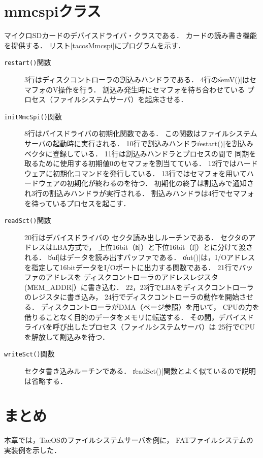 \section{mmcspiクラス}
\label{tacosLbaDriver}
マイクロSDカードのデバイスドライバ・クラスである．
カードの読み書き機能を提供する．
リスト\ref{tacosMmcspi}にプログラムを示す．

  

\begin{description}
\item[\texttt{restart()}関数]
  3行はディスクコントローラの割込みハンドラである．
  4行の\|semV()|はセマフォのV操作を行う．
  割込み発生時にセマフォを待ち合わせている
  プロセス（ファイルシステムサーバ）を起床させる．
\item[\texttt{initMmcSpi()}関数]
  8行はバイスドライバの初期化関数である．
  この関数はファイルシステムサーバの起動時に実行される．
  10行で割込みハンドラ\|restart()|を割込みベクタに登録している．
  11行は割込みハンドラとプロセスの間で
  同期を取るために使用する初期値0のセマフォを割当てている．
  12行ではハードウェアに初期化コマンドを発行している．
  13行ではセマフォを用いてハードウェアの初期化が終わるのを待つ．
  初期化の終了は割込みで通知され3行の割込みハンドラが実行される．
  割込みハンドラは4行でセマフォを待っているプロセスを起こす．
\item[\texttt{readSct()}関数]
  20行はデバイスドライバの
  セクタ読み出しルーチンである．
  セクタのアドレスはLBA方式で，
  上位16bit（\|h|）と下位16bit（\|l|）とに分けて渡される．
  \|buf|はデータを読み出すバッファである．
  \|out()|は，I/Oアドレスを指定して16bitデータをI/Oポートに出力する関数である．
  21行でバッファのアドレスを
  ディスクコントローラのアドレスレジスタ(\|MEM_ADDR|）に書き込む．
  22，23行でLBAをディスクコントローラのレジスタに書き込み，
  24行でディスクコントローラの動作を開始させる．
  ディスクコントローラがDMA（\pageref{dma}ページ参照）を用いて，
  CPUの力を借りることなく目的のデータをメモリに転送する．
  その間，デバイスドライバを呼び出したプロセス（ファイルシステムサーバ）は
  25行でCPUを解放して割込みを待つ．
\item[\texttt{writeSct()}関数]
  セクタ書き込みルーチンである．
  \|readSct()|関数とよく似ているので説明は省略する．
\end{description}

\section{まとめ}
本章では，TacOSのファイルシステムサーバを例に，
FATファイルシステムの実装例を示した．
